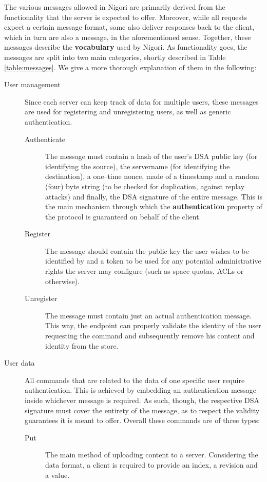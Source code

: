 The various messages allowed in Nigori are primarily derived from the functionality that the server is expected to offer.
Moreover, while all requests expect a certain message format, some also deliver responses back to the client, which in turn are also a message, in the aforementioned sense.
Together, these messages describe the \textbf{vocabulary} used by Nigori.
As functionality goes, the messages are split into two main categories, shortly described in Table \ref{table:messages}.
We give a more thorough explanation of them in the following:
\begin{description}
  \item[User management] Since each server can keep track of data for multiple users, these messages are used for registering and unregistering users, as well as generic authentication.
  \begin{description}
    \item[Authenticate] The message must contain a hash of the user's DSA public key (for identifying the source), the servername (for identifying the destination), a one--time nonce, made of a timestamp and a random (four) byte string (to be checked for duplication, against replay attacks) and finally, the DSA signature of the entire message.
    This is the main mechanism through which the \textbf{authentication} property of the protocol is guaranteed on behalf of the client.

    \item[Register] The message should contain the public key the user wishes to be identified by and a token to be used for any potential administrative rights the server may configure (such as space quotas, ACLs or otherwise).

    \item[Unregister] The message must contain just an actual authentication message.
    This way, the endpoint can properly validate the identity of the user requesting the command and subsequently remove his content and identity from the store.
  \end{description}

  \item[User data] All commands that are related to the data of one specific user require authentication.
  This is achieved by embedding an authentication message inside whichever message is required.
  As such, though, the respective DSA signature must cover the entirety of the message, as to respect the validity guarantees it is meant to offer.
  Overall these commands are of three types:
  \begin{description}
    \item[Put] The main method of uploading content to a server.
    Considering the data format, a client is required to provide an index, a revision and a value.


\end{description}
\end{description}
